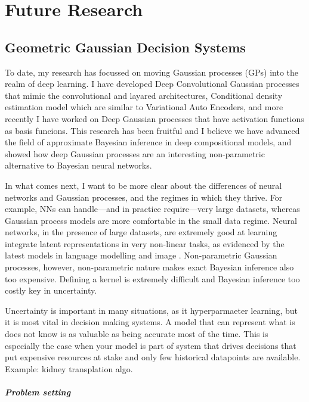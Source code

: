 \chapter{Future Research}

\section{Geometric Gaussian Decision Systems}

To date, my research has focussed on moving Gaussian processes (GPs) into the realm of deep learning. I have developed Deep Convolutional Gaussian processes that mimic the convolutional and layared architectures, Conditional density estimation model which are similar to Variational Auto Encoders, and more recently I have worked on Deep Gaussian processes that have activation functions as basis funcions. This research has been fruitful and I believe we have advanced the field of approximate Bayesian inference in deep compositional models, and showed how deep Gaussian processes are an interesting non-parametric alternative to Bayesian neural networks.

In what comes next, I want to be more clear about the differences of neural networks and Gaussian processes, and the regimes in which they thrive. For example, NNs can handle---and in practice require---very large datasets, whereas Gaussian process models are more comfortable in the small data regime. Neural networks, in the presence of large datasets, are extremely good at learning integrate latent representations in very non-linear tasks, as evidenced by the latest models in language modelling and image . Non-parametric Gaussian processes, however, 
non-parametric nature makes exact Bayesian inference also too expensive. 
Defining a kernel is extremely difficult and Bayesian inference too costly
key in uncertainty.

Uncertainty is important in many situations, as it hyperparmaeter learning, but it is most vital in decision making systems. A model that can represent what is does not know is as valuable as being accurate most of the time. This is especially the case when your model is part of system that drives decisions that put expensive resources at stake and only few historical datapoints are available. Example: kidney transplation algo.

\paragraph{Problem setting}

